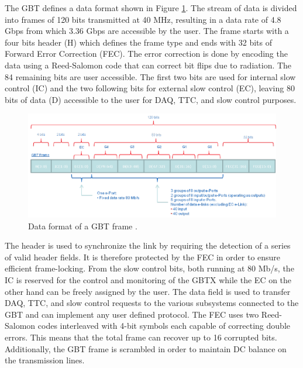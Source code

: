       The GBT defines a data format shown in Figure \ref{fig:II-2-gbt-frame}. The stream of data is divided into frames of 120 bits transmitted at 40 MHz, resulting in a data rate of 4.8 Gbps from which 3.36 Gbps are accessible by the user. The frame starts with a four bits header (H) which defines the frame type and ends with 32 bits of Forward Error Correction (FEC). The error correction is done by encoding the data using a Reed-Salomon code that can correct bit flips due to radiation. The 84 remaining bits are user accessible. The first two bits are used for internal slow control (IC) and the two following bits for external slow control (EC), leaving 80 bits of data (D) accessible to the user for DAQ, TTC, and slow control purposes. \\

      \begin{figure}[h!]
        \centering
        \includegraphics[width=\textwidth]{img/II-2-daq/gbt-frame.pdf}
        \caption{Data format of a GBT frame \cite{Moreira:1235836}.}
        \label{fig:II-2-gbt-frame}
      \end{figure}

      The header is used to synchronize the link by requiring the detection of a series of valid header fields. It is therefore protected by the FEC in order to ensure efficient frame-locking. From the slow control bits, both running at 80 Mb/s, the IC is reserved for the control and monitoring of the GBTX while the EC on the other hand can be freely assigned by the user. The data field is used to transfer DAQ, TTC, and slow control requests to the various subsystems connected to the GBT and can implement any user defined protocol. The FEC uses two Reed-Salomon codes interleaved with 4-bit symbols each capable of correcting double errors. This means that the total frame can recover up to 16 corrupted bits. Additionally, the GBT frame is scrambled in order to maintain DC balance on the transmission lines. \\

